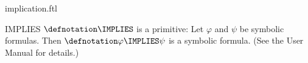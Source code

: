 \documentclass{stex}
\begin{document}
\begin{smodule}{implication.ftl}


\begin{documentation}{IMPLIES}
  $\defnotation\IMPLIES$ is a \Naproche primitive:
  Let $\varphi$ and $\psi$ be symbolic formulas.
  Then $\defnotation\varphi\IMPLIES\psi$ is a symbolic formula.
  (See the \Naproche User Manual for details.)
\end{documentation}

\end{smodule}
\end{document}

